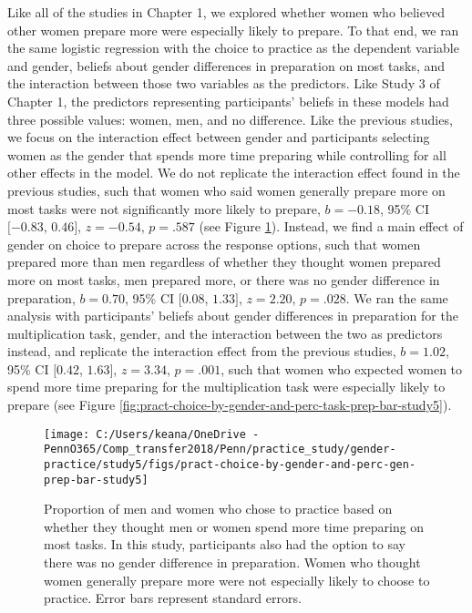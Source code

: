 \documentclass[letterpaper, nobind]{templates/ociamthesis}
\begin{document}
Like all of the studies in Chapter 1, we explored whether women who believed other women prepare more were especially likely to prepare. To that end, we ran the same logistic regression with the choice to practice as the dependent variable and gender, beliefs about gender differences in preparation on most tasks, and the interaction between those two variables as the predictors. Like Study 3 of Chapter 1, the predictors representing participants' beliefs in these models had three possible values: women, men, and no difference. Like the previous studies, we focus on the interaction effect between gender and participants selecting women as the gender that spends more time preparing while controlling for all other effects in the model. We do not replicate the interaction effect found in the previous studies, such that women who said women generally prepare more on most tasks were not significantly more likely to prepare, \(b = -0.18\), 95\% CI \([-0.83\), \(0.46]\), \(z = -0.54\), \(p = .587\) (see Figure \ref{fig:pract-choice-by-gender-and-perc-gen-prep-bar-study5}). Instead, we find a main effect of gender on choice to prepare across the response options, such that women prepared more than men regardless of whether they thought women prepared more on most tasks, men prepared more, or there was no gender difference in preparation, \(b = 0.70\), 95\% CI \([0.08\), \(1.33]\), \(z = 2.20\), \(p = .028\). We ran the same analysis with participants' beliefs about gender differences in preparation for the multiplication task, gender, and the interaction between the two as predictors instead, and replicate the interaction effect from the previous studies, \(b = 1.02\), 95\% CI \([0.42\), \(1.63]\), \(z = 3.34\), \(p = .001\), such that women who expected women to spend more time preparing for the multiplication task were especially likely to prepare (see Figure \ref{fig:pract-choice-by-gender-and-perc-task-prep-bar-study5}).

\begin{figure}

{\centering \texttt{[image: C:/Users/keana/OneDrive - PennO365/Comp\_transfer2018/Penn/practice\_study/gender-practice/study5/figs/pract-choice-by-gender-and-perc-gen-prep-bar-study5]} 

}

\caption{Proportion of men and women who chose to practice based on whether they thought men or women spend more time preparing on most tasks. In this study, participants also had the option to say there was no gender difference in preparation. Women who thought women generally prepare more were not especially likely to choose to practice. Error bars represent standard errors.}\label{fig:pract-choice-by-gender-and-perc-gen-prep-bar-study5}
\end{figure}
\end{document}
